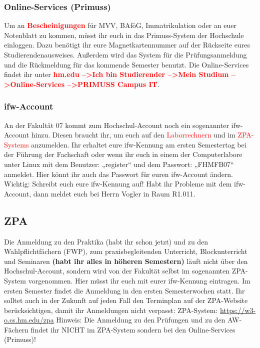 \subsubsection{Online-Services (Primuss)}
Um an \textcolor{red}{\textbf{Bescheinigungen}} für MVV, BAföG, Immatrikulation oder an euer Notenblatt zu kommen, müsst ihr euch in das Primuss-System der Hochschule einloggen. Dazu benötigt ihr eure Magnetkartennummer auf der Rückseite eures Studierendenausweises. Außerdem wird das System für die Prüfungsanmeldung und die Rückmeldung für das kommende Semester benutzt.\doublebreak
Die Online-Services findet ihr unter \textcolor{red}{\textbf{hm.edu --\textgreater Ich bin Studierender --\textgreater Mein Studium --\textgreater Online-Services --\textgreater PRIMUSS Campus IT}}.

\subsubsection{ifw-Account}

An der Fakultät 07 kommt zum Hochschul-Account noch ein sogenannter ifw-Account hinzu. Diesen braucht ihr, um euch auf den \textcolor{red}{Laborrechnern} und im \textcolor{red}{ZPA-Systems} anzumelden.\doublebreak
Ihr erhaltet eure ifw-Kennung am ersten Semestertag bei der Führung der Fachschaft oder wenn ihr euch in einem der Computerlabore unter Linux mit dem Benutzer: „register“ und dem Passwort: „FHMFB07“ anmeldet. Hier könnt ihr auch das Passwort für euren ifw-Account ändern. Wichtig: Schreibt euch eure ifw-Kennung auf!\doublebreak
Habt ihr Probleme mit dem ifw-Account, dann meldet euch bei Herrn Vogler in Raum R1.011.

\subsection{ZPA}

Die Anmeldung zu den Praktika (habt ihr schon jetzt) und zu den Wahlpflichtfächern (FWP), zum praxisbegleitenden Unterricht, Blockunterricht und Seminaren \textbf{(habt ihr alles in höheren Semestern)} läuft nicht über den Hochschul-Account, sondern wird von der Fakultät selbst im sogenannten ZPA-System vorgenommen. Hier müsst ihr euch mit eurer ifw-Kennung eintragen. Im ersten Semester findet die Anmeldung in den ersten Semesterwochen statt. Ihr solltet auch in der Zukunft auf jeden Fall den Terminplan auf der ZPA-Website berücksichtigen, damit ihr Anmeldungen nicht verpasst:\doublebreak
ZPA-System: \url{https://w3-o.cs.hm.edu/zpa}\doublebreak
Hinweis: Die Anmeldung zu den Prüfungen und zu den AW-Fächern findet ihr NICHT im ZPA-System sondern bei den Online-Services (Primuss)!

